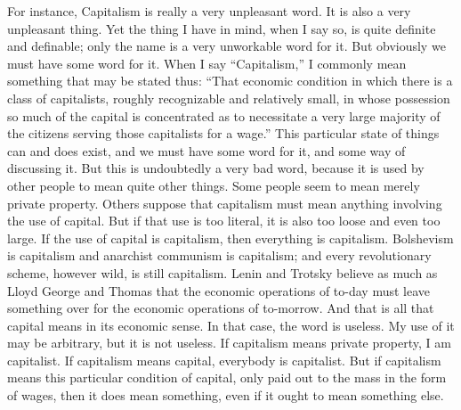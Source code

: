 \documentclass{book}
\begin{document}
For instance, Capitalism is really a very unpleasant word. It is also a very unpleasant thing. Yet the thing I have in mind, when I say so, is quite definite and definable; only the name is a very unworkable word for it. But obviously we must have some word for it. When I say “Capitalism,” I commonly mean something that may be stated thus: “That economic condition in which there is a class of capitalists, roughly recognizable and relatively small, in whose possession so much of the capital is concentrated as to necessitate a very large majority of the citizens serving those capitalists for a wage.” This particular state of things can and does exist, and we must have some word for it, and some way of discussing it. But this is undoubtedly a very bad word, because it is used by other people to mean quite other things. Some people seem to mean merely private property. Others suppose that capitalism must mean anything involving the use of capital. But if that use is too literal, it is also too loose and even too large. If the use of capital is capitalism, then everything is capitalism. Bolshevism is capitalism and anarchist communism is capitalism; and every revolutionary scheme, however wild, is still capitalism. Lenin and Trotsky believe as much as Lloyd George and Thomas that the economic operations of to-day must leave something over for the economic operations of to-morrow. And that is all that capital means in its economic sense. In that case, the word is useless. My use of it may be arbitrary, but it is not useless. If capitalism means private property, I am capitalist. If capitalism means capital, everybody is capitalist. But if capitalism means this particular condition of capital, only paid out to the mass in the form of wages, then it does mean something, even if it ought to mean something else.
\end{document}
